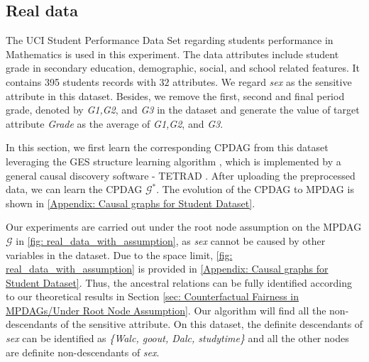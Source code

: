\documentclass{article}
\begin{document}
\subsection{Real data}
The UCI Student Performance Data Set \citep{cortez2008using} regarding students performance in Mathematics is used in this experiment. The data attributes include student grade in secondary education, demographic, social, and school related features. It contains 395 students records with $32$ attributes. We regard \textit{sex} as the sensitive attribute in this dataset. Besides, we remove the first, second and final period grade, denoted by \textit{G1,G2}, and \textit{G3} in the dataset and generate the value of target attribute \textit{Grade} as the average of \textit{G1,G2}, and \textit{G3}.

In this section, we first learn the corresponding CPDAG from this dataset leveraging the GES structure learning algorithm \citep{chickering2002learning}, which is implemented by a general causal discovery software - TETRAD \citep{ramsey2018tetrad}. After uploading the preprocessed data, we can learn the CPDAG $\mathcal{G^*}$. The evolution of the CPDAG to MPDAG is shown in \cref{Appendix: Causal graphs for Student Dataset}. 

Our experiments are carried out under the root node assumption on the MPDAG $\mathcal{G}$ in \cref{fig: real_data_with_assumption}, as \textit{sex} cannot be caused by other variables in the dataset. Due to the space limit, \cref{fig: real_data_with_assumption} is provided in \cref{Appendix: Causal graphs for Student Dataset}. Thus, the ancestral relations can be fully identified according to our theoretical results in Section \ref{sec: Counterfactual Fairness in MPDAGs/Under Root Node Assumption}. Our algorithm will find all the non-descendants of the sensitive attribute. On this dataset, the definite descendants of \textit{sex} can be identified as \textit{\{Walc, goout, Dalc, studytime\}} and all the other nodes are definite non-descendants of \textit{sex}.
\end{document}
